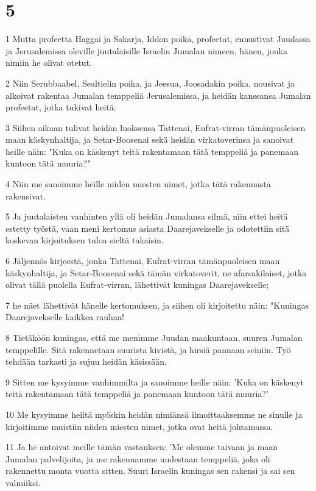 \chapter{5}

\par 1 Mutta profeetta Haggai ja Sakarja, Iddon poika, profeetat, ennustivat Juudassa ja Jerusalemissa oleville juutalaisille Israelin Jumalan nimeen, hänen, jonka nimiin he olivat otetut.
\par 2 Niin Serubbaabel, Sealtielin poika, ja Jeesua, Joosadakin poika, nousivat ja alkoivat rakentaa Jumalan temppeliä Jerusalemissa, ja heidän kanssansa Jumalan profeetat, jotka tukivat heitä.
\par 3 Siihen aikaan tulivat heidän luoksensa Tattenai, Eufrat-virran tämänpuoleisen maan käskynhaltija, ja Setar-Boosenai sekä heidän virkatoverinsa ja sanoivat heille näin: "Kuka on käskenyt teitä rakentamaan tätä temppeliä ja panemaan kuntoon tätä muuria?"
\par 4 Niin me sanoimme heille niiden miesten nimet, jotka tätä rakennusta rakensivat.
\par 5 Ja juutalaisten vanhinten yllä oli heidän Jumalansa silmä, niin ettei heitä estetty työstä, vaan meni kertomus asiasta Daarejavekselle ja odotettiin sitä koskevan kirjoituksen tuloa sieltä takaisin.
\par 6 Jäljennös kirjeestä, jonka Tattenai, Eufrat-virran tämänpuoleisen maan käskynhaltija, ja Setar-Boosenai sekä tämän virkatoverit, ne afarsakilaiset, jotka olivat tällä puolella Eufrat-virran, lähettivät kuningas Daarejavekselle;
\par 7 he näet lähettivät hänelle kertomuksen, ja siihen oli kirjoitettu näin: "Kuningas Daarejavekselle kaikkea rauhaa!
\par 8 Tietäköön kuningas, että me menimme Juudan maakuntaan, suuren Jumalan temppelille. Sitä rakennetaan suurista kivistä, ja hirsiä pannaan seiniin. Työ tehdään tarkasti ja sujuu heidän käsissään.
\par 9 Sitten me kysyimme vanhimmilta ja sanoimme heille näin: 'Kuka on käskenyt teitä rakentamaan tätä temppeliä ja panemaan kuntoon tätä muuria?'
\par 10 Me kysyimme heiltä myöskin heidän nimiänsä ilmoittaaksemme ne sinulle ja kirjoitimme muistiin niiden miesten nimet, jotka ovat heitä johtamassa.
\par 11 Ja he antoivat meille tämän vastauksen: 'Me olemme taivaan ja maan Jumalan palvelijoita, ja me rakennamme uudestaan temppeliä, joka oli rakennettu monta vuotta sitten. Suuri Israelin kuningas sen rakensi ja sai sen valmiiksi.
